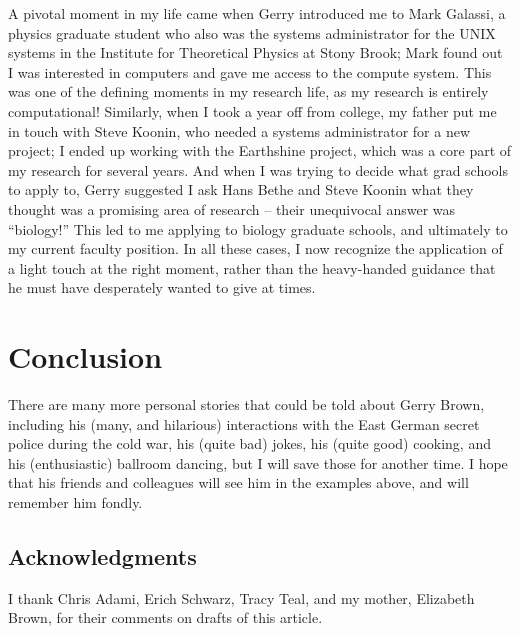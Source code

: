 A pivotal moment in my life came when Gerry introduced me to Mark
Galassi, a physics graduate student who also was the systems
administrator for the UNIX systems in the Institute for Theoretical
Physics at Stony Brook; Mark found out I was interested in computers
and gave me access to the compute system. This was one of the defining
moments in my research life, as my research is entirely computational!
Similarly, when I took a year off from college, my father put me in
touch with Steve Koonin, who needed a systems administrator for a new
project; I ended up working with the Earthshine project, which was a
core part of my research for several years. And when I was trying to
decide what grad schools to apply to, Gerry suggested I ask Hans Bethe
and Steve Koonin what they thought was a promising area of research --
their unequivocal answer was ``biology!''  This led to me applying to
biology graduate schools, and ultimately to my current faculty
position. In all these cases, I now recognize the application of a
light touch at the right moment, rather than the heavy-handed guidance
that he must have desperately wanted to give at times.

\section*{Conclusion}

There are many more personal stories that could be told about Gerry
Brown, including his (many, and hilarious) interactions with the East
German secret police during the cold war, his (quite bad) jokes, his
(quite good) cooking, and his (enthusiastic) ballroom dancing, but I
will save those for another time. I hope that his friends and
colleagues will see him in the examples above, and will remember him
fondly.


\subsection*{Acknowledgments}

I thank Chris Adami, Erich Schwarz, Tracy Teal, and my mother,
Elizabeth Brown, for their comments on drafts of this article.




